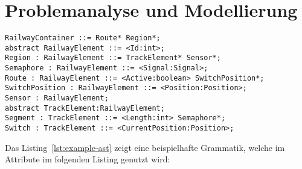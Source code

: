 \chapter{Problemanalyse und Modellierung}

\blindtext
{}

\begin{lstlisting}[language=AST,label={lst:example-ast},caption={Example AST}]
RailwayContainer ::= Route* Region*;
abstract RailwayElement ::= <Id:int>;
Region : RailwayElement ::= TrackElement* Sensor*;
Semaphore : RailwayElement ::= <Signal:Signal>;
Route : RailwayElement ::= <Active:boolean> SwitchPosition*;
SwitchPosition : RailwayElement ::= <Position:Position>;
Sensor : RailwayElement;
abstract TrackElement:RailwayElement;
Segment : TrackElement ::= <Length:int> Semaphore*;
Switch : TrackElement ::= <CurrentPosition:Position>;
\end{lstlisting}
%
Das Listing~\ref{lst:example-ast} zeigt eine beispielhafte Grammatik, welche im Attribute im folgenden Listing genutzt wird:


